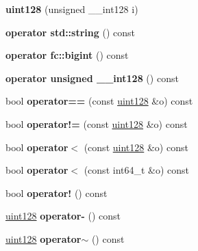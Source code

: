 \begin{DoxyCompactItemize}
{\bfseries uint128} (unsigned \+\_\+\+\_\+int128 i)
\item 
\mbox{\label{classfc_1_1uint128_a43909a3236e3c9d88df7ebd7ff7103f8}} 
{\bfseries operator std\+::string} () const
\item 
\mbox{\label{classfc_1_1uint128_a47b07b2268b2f02351d14e88b40a5983}} 
{\bfseries operator fc\+::bigint} () const
\item 
\mbox{\label{classfc_1_1uint128_a17ee1cc2d2e629f73a659840f7badb46}} 
{\bfseries operator unsigned \+\_\+\+\_\+int128} () const
\item 
\mbox{\label{classfc_1_1uint128_ad980f1830d25772471514765362de3e9}} 
bool {\bfseries operator==} (const \mbox{\hyperlink{classfc_1_1uint128}{uint128}} \&o) const
\item 
\mbox{\label{classfc_1_1uint128_a246b243081b3c341ee5cbec1a3b6ff23}} 
bool {\bfseries operator!=} (const \mbox{\hyperlink{classfc_1_1uint128}{uint128}} \&o) const
\item 
\mbox{\label{classfc_1_1uint128_ad93d711aa5ce31c00c7cff65609e99f2}} 
bool {\bfseries operator$<$} (const \mbox{\hyperlink{classfc_1_1uint128}{uint128}} \&o) const
\item 
\mbox{\label{classfc_1_1uint128_a44dfbd7811fdf659329f71db25f49684}} 
bool {\bfseries operator$<$} (const int64\+\_\+t \&o) const
\item 
\mbox{\label{classfc_1_1uint128_a2a4e3a4f77747c79888fdf8cb84e032f}} 
bool {\bfseries operator!} () const
\item 
\mbox{\label{classfc_1_1uint128_a3505056634ad201c371c4634664e898c}} 
\mbox{\hyperlink{classfc_1_1uint128}{uint128}} {\bfseries operator-\/} () const
\item 
\mbox{\label{classfc_1_1uint128_ad41cb3c1f8bb21cb064611b69a91ba8b}} 
\mbox{\hyperlink{classfc_1_1uint128}{uint128}} {\bfseries operator$\sim$} () const
\item 

\end{DoxyCompactItemize}
